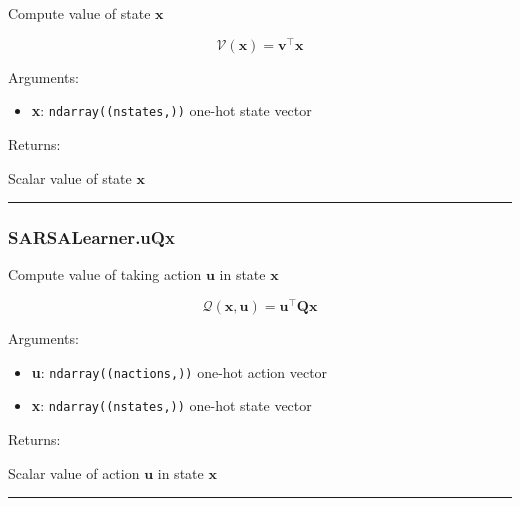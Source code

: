 \begin{Shaded}
\begin{Highlighting}[]
\end{Highlighting}
\end{Shaded}

Compute value of state \(\mathbf x\)

\[
\mathcal V(\mathbf x) = \mathbf v^\top \mathbf x
\]

Arguments:

\begin{itemize}
\tightlist
\item
  \textbf{x}: \texttt{ndarray((nstates,))} one-hot state vector
\end{itemize}

Returns:

Scalar value of state \(\mathbf x\)

\begin{center}\rule{0.5\linewidth}{\linethickness}\end{center}

\subsubsection{SARSALearner.uQx}\label{sarsalearner.uqx}

\begin{Shaded}
\begin{Highlighting}[]
\end{Highlighting}
\end{Shaded}

Compute value of taking action \(\mathbf u\) in state \(\mathbf x\)

\[
\mathcal Q(\mathbf x, \mathbf u) = \mathbf u^\top \mathbf Q \mathbf x
\]

Arguments:

\begin{itemize}
\tightlist
\item
  \textbf{u}: \texttt{ndarray((nactions,))} one-hot action vector
\item
  \textbf{x}: \texttt{ndarray((nstates,))} one-hot state vector
\end{itemize}

Returns:

Scalar value of action \(\mathbf u\) in state \(\mathbf x\)

\begin{center}\rule{0.5\linewidth}{\linethickness}\end{center}

